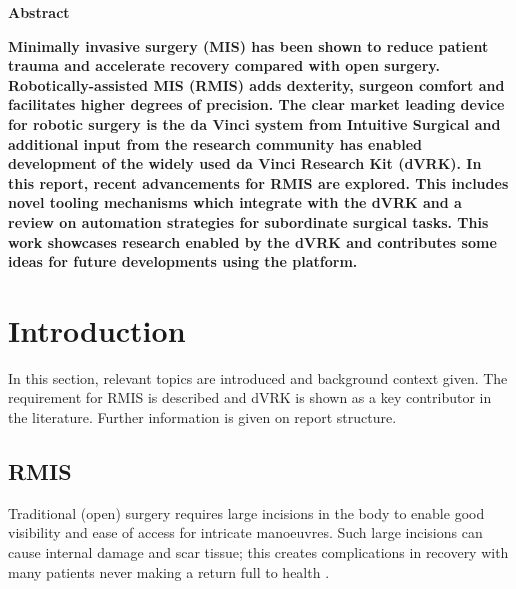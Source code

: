 \documentclass[english]{sobraep}
\begin{document}
\setcounter{page}{1}
\thispagestyle{plain}
\begin{center}
    
    \textbf{Abstract}
\end{center}
\textbf{Minimally invasive surgery (MIS) has been shown to reduce patient trauma and accelerate recovery compared with open surgery. Robotically-assisted MIS (RMIS) adds dexterity, surgeon comfort and facilitates higher degrees of precision. The clear market leading device for robotic surgery is the da Vinci system from Intuitive Surgical and additional input from the research community has enabled development of the widely used da Vinci Research Kit (dVRK). In this report, recent advancements for RMIS are explored. This includes novel tooling mechanisms which integrate with the dVRK and a review on automation strategies for subordinate surgical tasks. This work showcases research enabled by the dVRK and contributes some ideas for future developments using the platform.}

\section{Introduction}
\par{In this section, relevant topics are introduced and background context given. The requirement for RMIS is described and dVRK is shown as a key contributor in the literature. Further information is given on report structure. }


\subsection{RMIS}
\par{Traditional (open) surgery requires large incisions in the body to enable good visibility and ease of access for intricate manoeuvres. Such large incisions can cause internal damage and scar tissue; this creates complications in recovery with many patients never making a return full to health \cite{Nezhat2021}.}
\end{document}
